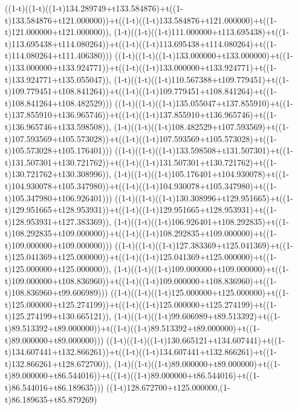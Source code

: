 ((1-t)((1-t)((1-t)134.289749+t133.584876)+t((1-t)133.584876+t121.000000))+t((1-t)((1-t)133.584876+t121.000000)+t((1-t)121.000000+t121.000000)),                                     (1-t)((1-t)((1-t)111.000000+t113.695438)+t((1-t)113.695438+t114.080264))+t((1-t)((1-t)113.695438+t114.080264)+t((1-t)114.080264+t111.406380)))
((1-t)((1-t)((1-t)133.000000+t133.000000)+t((1-t)133.000000+t133.924771))+t((1-t)((1-t)133.000000+t133.924771)+t((1-t)133.924771+t135.055047)),                                     (1-t)((1-t)((1-t)110.567388+t109.779451)+t((1-t)109.779451+t108.841264))+t((1-t)((1-t)109.779451+t108.841264)+t((1-t)108.841264+t108.482529)))
((1-t)((1-t)((1-t)135.055047+t137.855910)+t((1-t)137.855910+t136.965746))+t((1-t)((1-t)137.855910+t136.965746)+t((1-t)136.965746+t133.598508)),                                     (1-t)((1-t)((1-t)108.482529+t107.593569)+t((1-t)107.593569+t105.573028))+t((1-t)((1-t)107.593569+t105.573028)+t((1-t)105.573028+t105.176401)))
((1-t)((1-t)((1-t)133.598508+t131.507301)+t((1-t)131.507301+t130.721762))+t((1-t)((1-t)131.507301+t130.721762)+t((1-t)130.721762+t130.308996)),                                     (1-t)((1-t)((1-t)105.176401+t104.930078)+t((1-t)104.930078+t105.347980))+t((1-t)((1-t)104.930078+t105.347980)+t((1-t)105.347980+t106.926401)))
((1-t)((1-t)((1-t)130.308996+t129.951665)+t((1-t)129.951665+t128.953931))+t((1-t)((1-t)129.951665+t128.953931)+t((1-t)128.953931+t127.383369)),                                     (1-t)((1-t)((1-t)106.926401+t108.292835)+t((1-t)108.292835+t109.000000))+t((1-t)((1-t)108.292835+t109.000000)+t((1-t)109.000000+t109.000000)))
((1-t)((1-t)((1-t)127.383369+t125.041369)+t((1-t)125.041369+t125.000000))+t((1-t)((1-t)125.041369+t125.000000)+t((1-t)125.000000+t125.000000)),                                     (1-t)((1-t)((1-t)109.000000+t109.000000)+t((1-t)109.000000+t108.836960))+t((1-t)((1-t)109.000000+t108.836960)+t((1-t)108.836960+t99.606989)))
((1-t)((1-t)((1-t)125.000000+t125.000000)+t((1-t)125.000000+t125.274199))+t((1-t)((1-t)125.000000+t125.274199)+t((1-t)125.274199+t130.665121)),                                     (1-t)((1-t)((1-t)99.606989+t89.513392)+t((1-t)89.513392+t89.000000))+t((1-t)((1-t)89.513392+t89.000000)+t((1-t)89.000000+t89.000000)))
((1-t)((1-t)((1-t)130.665121+t134.607441)+t((1-t)134.607441+t132.866261))+t((1-t)((1-t)134.607441+t132.866261)+t((1-t)132.866261+t128.672700)),                                     (1-t)((1-t)((1-t)89.000000+t89.000000)+t((1-t)89.000000+t86.544016))+t((1-t)((1-t)89.000000+t86.544016)+t((1-t)86.544016+t86.189635)))
((1-t)128.672700+t125.000000,(1-t)86.189635+t85.879269)
